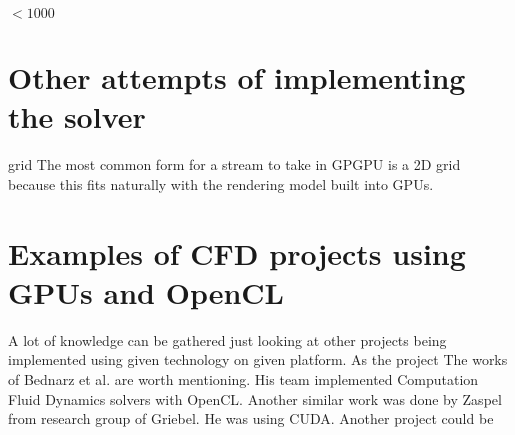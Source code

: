  $< 1000$

\section{Other attempts of implementing the solver}

grid The most common form for a stream to take in GPGPU is a 2D grid because this fits naturally with the rendering model built into GPUs. 

\section{Examples of CFD projects using GPUs and OpenCL}
A lot of knowledge can be gathered just looking at other projects being implemented using given technology on given platform. As the project  The works of Bednarz et al. are worth mentioning. His team implemented Computation Fluid Dynamics solvers with OpenCL. Another similar work was done by Zaspel from research group of Griebel. He was using CUDA. Another project could be 





